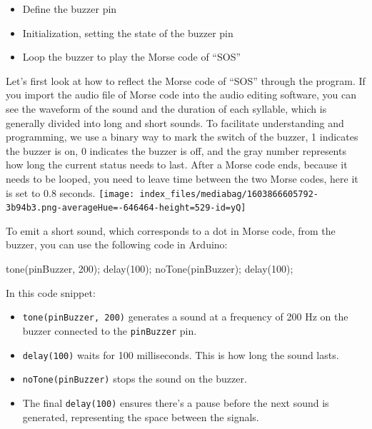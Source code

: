 \documentclass[
  letterpaper,
  DIV=11,
  numbers=noendperiod]{scrreprt}
\newenvironment{Shaded}{\begin{snugshade}}{\end{snugshade}}
\newcommand{\DecValTok}[1]{\textcolor[rgb]{0.68,0.00,0.00}{#1}}
\newcommand{\NormalTok}[1]{\textcolor[rgb]{0.00,0.23,0.31}{#1}}
\newcommand{\OperatorTok}[1]{\textcolor[rgb]{0.37,0.37,0.37}{#1}}
\providecommand{\tightlist}{%
  \setlength{\itemsep}{0pt}\setlength{\parskip}{0pt}}\usepackage{longtable,booktabs,array}
\begin{document}
\begin{itemize}
\tightlist
\item
  Define the buzzer pin
\item
  Initialization, setting the state of the buzzer pin
\item
  Loop the buzzer to play the Morse code of ``SOS''
\end{itemize}

Let's first look at how to reflect the Morse code of ``SOS'' through the
program. If you import the audio file of Morse code into the audio
editing software, you can see the waveform of the sound and the duration
of each syllable, which is generally divided into long and short sounds.
To facilitate understanding and programming, we use a binary way to mark
the switch of the buzzer, 1 indicates the buzzer is on, 0 indicates the
buzzer is off, and the gray number represents how long the current
status needs to last. After a Morse code ends, because it needs to be
looped, you need to leave time between the two Morse codes, here it is
set to 0.8 seconds.
\texttt{[image: index\_files/mediabag/1603866605792-3b94b3.png-averageHue=-646464-height=529-id=yQ]}

To emit a short sound, which corresponds to a dot in Morse code, from
the buzzer, you can use the following code in Arduino:

\begin{Shaded}
\begin{Highlighting}[]
\NormalTok{tone}\OperatorTok{(}\NormalTok{pinBuzzer}\OperatorTok{,} \DecValTok{200}\OperatorTok{);}
\NormalTok{delay}\OperatorTok{(}\DecValTok{100}\OperatorTok{);}
\NormalTok{noTone}\OperatorTok{(}\NormalTok{pinBuzzer}\OperatorTok{);}
\NormalTok{delay}\OperatorTok{(}\DecValTok{100}\OperatorTok{);}
\end{Highlighting}
\end{Shaded}

In this code snippet:

\begin{itemize}
\tightlist
\item
  \texttt{tone(pinBuzzer,\ 200)} generates a sound at a frequency of 200
  Hz on the buzzer connected to the \texttt{pinBuzzer} pin.
\item
  \texttt{delay(100)} waits for 100 milliseconds. This is how long the
  sound lasts.
\item
  \texttt{noTone(pinBuzzer)} stops the sound on the buzzer.
\item
  The final \texttt{delay(100)} ensures there's a pause before the next
  sound is generated, representing the space between the signals.
\end{itemize}
\end{document}
